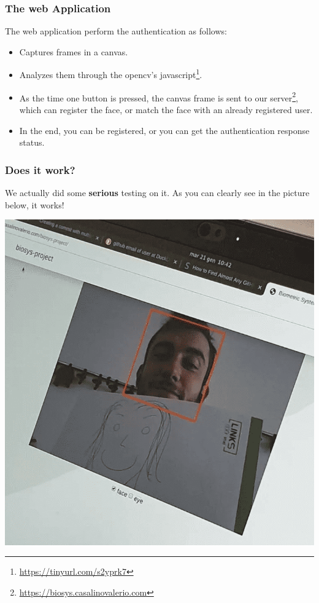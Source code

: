 \begin{frame} \frametitle{The web Application}

	The web application perform the authentication as follows:
	
	\vfill

	\begin{itemize}
	 	\item Captures frames in a canvas.
	 	\item Analyzes them through the opencv's javascript\footnote{{ \color{red}
	 	\url{https://tinyurl.com/s2yprk7}}}.
	 	\item As the time one button is pressed, the canvas frame is sent to our
	 	server\footnote{{ \color{red} \url{https://biosys.casalinovalerio.com}}},
	 	which can register the face, or match the face with an already registered
	 	user.
	 	\item In the end, you can be registered, or you can get the authentication
	 	response status.
	\end{itemize}
	 
	\vfill

\end{frame}

\begin{frame} \frametitle{Does it work?}

	We actually did some \textbf{serious} testing on it. As you can
	clearly see in the picture below, it works!
	\begin{center}
		\includegraphics[width=.45\textwidth]{img/serious-testing}
	\end{center}
	

\end{frame}